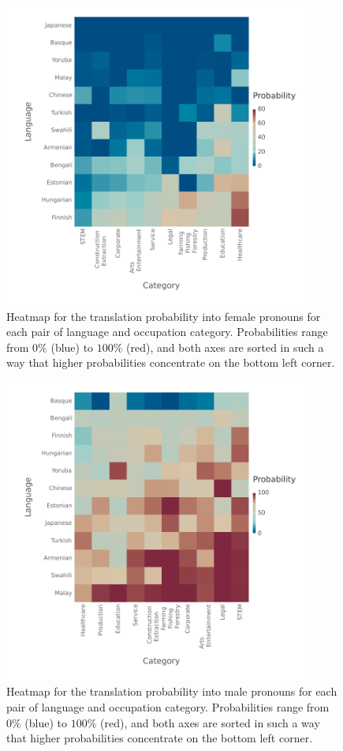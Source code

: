 \documentclass[fleqn,10pt]{article}
\begin{document}
\begin{figure}[H]
	\centering
	\includegraphics[width=10cm]{pictures/heatmap-languages-categories-Female}
	\caption{Heatmap for the translation probability into female pronouns for each pair of language and occupation category. Probabilities range from $0\%$ (blue) to $100\%$ (red), and both axes are sorted in such a way that higher probabilities concentrate on the bottom left corner.}
	\label{fig:heatmap-female}
\end{figure}

\begin{figure}[H]
	\centering
	\includegraphics[width=10cm]{pictures/heatmap-languages-categories-Male}
	\caption{Heatmap for the translation probability into male pronouns for each pair of language and occupation category. Probabilities range from $0\%$ (blue) to $100\%$ (red), and both axes are sorted in such a way that higher probabilities concentrate on the bottom left corner.}
	\label{fig:heatmap-male}
\end{figure}
\end{document}
